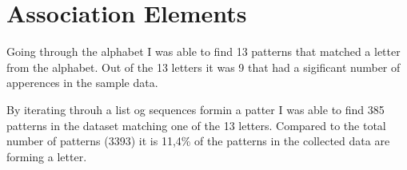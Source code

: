 \section{Association Elements} \label{sec:associationelements}
	Going through the alphabet I was able to find 13 patterns that matched a letter from the alphabet. Out of the 13 letters it was 9 that had a sigificant number of apperences in the sample data. 

  By iterating throuh a list og sequences formin a patter I was able to find 385 patterns in the dataset matching one of the 13 letters. Compared to the total number of patterns (3393) it is 11,4\% of the patterns in the collected data are forming a letter.

  \clearpage

    \begin{figure}[H]
      \centering
      \vspace{1.5cm}



\end{figure}
